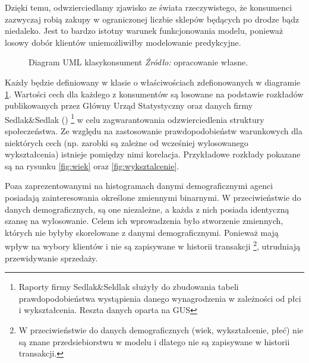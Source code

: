 \documentclass[polish, twoside, 12pt, a4paper]{article}
\theoremstyle{definition}
\theoremstyle{plain}
\theoremstyle{remark}
\begin{document}
Dzięki temu, odwzierciedlamy zjawisko ze świata rzeczywistego, że konsumenci zazwyczaj robią zakupy w ograniczonej liczbie sklepów będących po drodze bądz niedaleko. Jest to bardzo istotny warunek funkcjonowania modelu, ponieważ losowy dobór klientów uniemożliwiłby modelowanie predykcyjne.


\begin{figure}[hbt]
  \centering
{}
  \captionsetup{margin=10pt,font=small,labelfont=bf,width=.8\textwidth}
  \caption[Diagram UML klasy konsument]{Diagram UML klasykonsument \textit{Źródło:} opracowanie własne.}\label{UML:konsument}
\end{figure}

Każdy będzie definiowany w klasie o właściwościach zdefionowanych w diagramie \ref{UML:konsument}. Wartości cech dla każdego z konsumentów są losowane na podstawie rozkładów publikowanych przez Główny Urząd Statystyczny \cite{GUS2011} oraz danych firmy Sedlak\&Sedlak (\cite{Sedlak2013}) \footnote{Raporty firmy Sedlak\&Seldlak służyły do zbudowania tabeli prawdopodobieństwa wystąpienia danego wynagrodzenia w zależności od płci i wykształcenia. Reszta danych oparta na GUS} w celu zagwarantowania odzwierciedlenia struktury społeczeństwa. Ze względu na zastosowanie prawdopodobieństw warunkowych dla niektórych cech (np. zarobki są zależne od wcześniej wylosowanego wykształcenia) istnieje pomiędzy nimi korelacja. Przykładowe rozkłady pokazane są na rysunku \ref{fig:wiek} oraz \ref{fig:wyksztalcenie}.

Poza zaprezentowanymi na histogramach danymi demograficznymi agenci posiadają zainteresowania określone zmiennymi binarnymi. W przeciwieństwie do danych demograficznych, są one niezależne, a każda z nich posiada identyczną szansę na wylosowanie. Celem ich wprowadzenia było stworzenie zmiennych, których nie byłyby skorelowane z danymi demograficznymi. Ponieważ mają wpływ na wybory klientów i nie są zapisywane w historii transakcji \footnote{W przeciwieństwie do danych demograficznych (wiek, wykształcenie, płeć) nie są znane przedsiebiorstwu w modelu i dlatego nie są zapisywane w historii transakcji.}, utrudniają przewidywanie sprzedaży.
\end{document}
